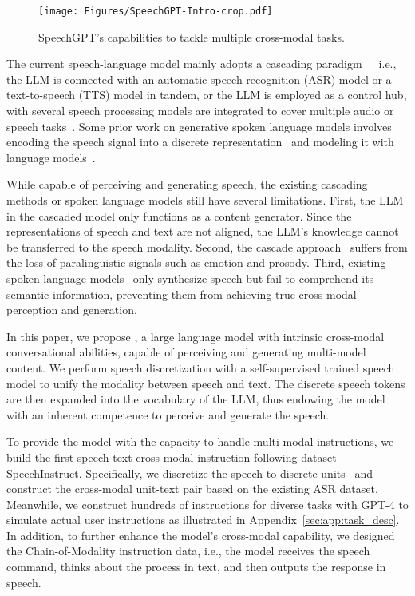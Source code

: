 \begin{figure}[t]
\centering
\texttt{[image: Figures/SpeechGPT-Intro-crop.pdf]} %
\caption{SpeechGPT's capabilities to tackle multiple cross-modal tasks.}
\label{fig:task_intro}
\end{figure}

The current speech-language model mainly adopts a cascading paradigm~\citep{huang2023audiogpt}~\, i.e., the LLM is connected with an automatic speech recognition (ASR) model or a text-to-speech (TTS) model in tandem, or the LLM is employed as a control hub, with several speech processing models are integrated to cover multiple audio or speech tasks~\citep{huang2023audiogpt, shen2023hugginggpt}. Some prior work on generative spoken language models involves encoding the speech signal into a discrete representation~\citep{baevski2020wav2vec, hsu2021hubert} and modeling it with language models~\citep{lakhotia2021generative,borsos2022audiolm, zhang2023speak, wang2023neural}.

While capable of perceiving and generating speech, the existing cascading methods or spoken language models still have several limitations. First, the LLM in the cascaded model only functions as a content generator. Since the representations of speech and text are not aligned, the LLM's knowledge cannot be transferred to the speech modality. Second, the cascade approach~\citep{shen2023hugginggpt, huang2023audiogpt} suffers from the loss of paralinguistic signals such as emotion and prosody. Third, existing spoken language models~\citep{wang2023neural, zhang2023speak} only synthesize speech but fail to comprehend its semantic information, preventing them from achieving true cross-modal perception and generation.

In this paper, we propose \method, a large language model with
intrinsic cross-modal conversational abilities, capable of perceiving and generating multi-model content.
We perform speech discretization with a self-supervised trained speech model to unify the modality between speech and text. The discrete speech tokens are then expanded into the vocabulary of the LLM, thus endowing the model with an inherent competence to perceive and generate the speech.

To provide the model with the capacity to handle multi-modal instructions, we build the first speech-text cross-modal instruction-following dataset SpeechInstruct. Specifically, we discretize the speech to discrete units~\citep{hsu2021hubert} and construct the cross-modal unit-text pair based on the existing ASR dataset. Meanwhile, we construct hundreds of instructions for diverse tasks with GPT-4 to simulate actual user instructions as illustrated in Appendix~\ref{sec:app:task_desc}. In addition, to further enhance the model's cross-modal capability, we designed the Chain-of-Modality instruction data, i.e., the model receives the speech command, thinks about the process in text, and then outputs the response in speech.

